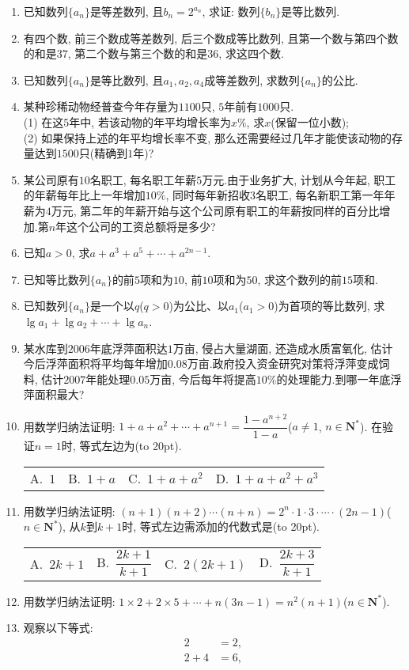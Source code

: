 \documentclass[10pt,a4paper]{article}
\newcommand{\bracket}[1]{(\hbox to #1pt{})}
\newcommand{\fourch}[4]{\par\begin{tabular}{p{.23\textwidth}p{.23\textwidth}p{.23\textwidth}p{.23\textwidth}}
A.~#1 &B.~#2& C.~#3& D.~#4
\end{tabular}}
\begin{document}
\begin{enumerate}[1.]
\item 已知数列$\{a_n\}$是等差数列, 且$b_n=2^{a_n}$, 求证: 数列$\{b_n\}$是等比数列.
\item 有四个数, 前三个数成等差数列, 后三个数成等比数列, 且第一个数与第四个数的和是$37$, 第二个数与第三个数的和是$36$, 求这四个数.
\item 已知数列$\{a_n\}$是等比数列, 且$a_1,a_2,a_4$成等差数列, 求数列$\{a_n\}$的公比.
\item 某种珍稀动物经普查今年存量为$1100$只, $5$年前有$1000$只.\\
(1) 在这$5$年中, 若该动物的年平均增长率为$x\%$, 求$x$(保留一位小数);\\
(2) 如果保持上述的年平均增长率不变, 那么还需要经过几年才能使该动物的存量达到$1500$只(精确到$1$年)?
\item 某公司原有$10$名职工, 每名职工年薪$5$万元.由于业务扩大, 计划从今年起, 职工的年薪每年比上一年增加$10\%$, 同时每年新招收$3$名职工, 每名新职工第一年年薪为$4$万元, 第二年的年薪开始与这个公司原有职工的年薪按同样的百分比增加.第$n$年这个公司的工资总额将是多少?
\item 已知$a>0$, 求$a+a^3+a^5+\cdots +a^{2n-1}$.
\item 已知等比数列$\{a_n\}$的前$5$项和为$10$, 前$10$项和为$50$, 求这个数列的前$15$项和.
\item 已知数列$\{a_n\}$是一个以$q$($q>0$)为公比、以$a_1$($a_1>0$)为首项的等比数列, 求$\lg a_1+\lg a_2+\cdots +\lg a_n$.
\item 某水库到$2006$年底浮萍面积达$1$万亩, 侵占大量湖面, 还造成水质富氧化, 估计今后浮萍面积将平均每年增加$0.08$万亩.政府投入资金研究对策将浮萍变成饲料, 估计$2007$年能处理$0.05$万亩, 今后每年将提高$10\%$的处理能力.到哪一年底浮萍面积最大?
\item 用数学归纳法证明: $1+a+a^2+\cdots +a^{n+1}=\dfrac{1-a^{n+2}}{1-a}$($a\ne 1$, $n\in \mathbf{N}^*$). 在验证$n=1$时, 等式左边为\bracket{20}.
\fourch{$1$}{$1+a$}{$1+a+a^2$}{$1+a+a^2+a^3$}
\item 用数学归纳法证明: $(n+1)(n+2)\cdots (n+n)=2^n\cdot 1\cdot 3\cdot \cdots \cdot (2n-1)$($n\in \mathbf{N}^*$), 从$k$到$k+1$时, 等式左边需添加的代数式是\bracket{20}.
\fourch{$2k+1$}{$\dfrac{2k+1}{k+1}$}{$2(2k+1)$}{$\dfrac{2k+3}{k+1}$}
\item 用数学归纳法证明: $1\times 2+2\times 5+\cdots +n(3n-1)=n^2(n+1)$($n\in \mathbf{N}^*$).
\item 观察以下等式:\\
\begin{align*}
    2 &= 2,\\ 
    2+4 &= 6,\\

\end{align*}
\end{enumerate}
\end{document}
